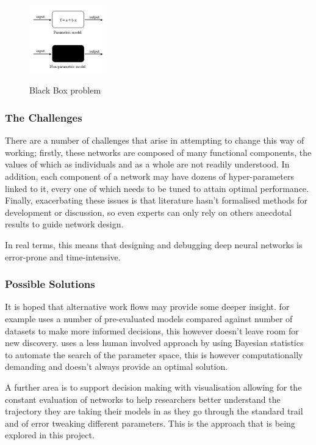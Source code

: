 \documentclass[a4paper,11pt,titlepage]{article}
\begin{document}
		\begin{figure}[H]
    			\centering	
			{{\includegraphics[width=0.3\textwidth]
    				{img/black_box.png} 
    			}}%
    			\caption{Black Box problem}%
    			\label{fig:BlackBox}
		\end{figure}	
		
		\subsubsection{The Challenges}
		
		There are a number of challenges that arise in attempting to change this way of working; firstly, these networks are composed of many functional components, the values of which as individuals and as a whole are not readily understood. In addition, each component of a network may have dozens of hyper-parameters linked to it, every one of which needs to be tuned to attain optimal performance. Finally, exacerbating these issues is that literature hasn't formalised methods for development or discussion, so even experts can only rely on others anecdotal results to guide network design.
		\par 
		In real terms, this means that designing and debugging deep neural networks is error-prone and time-intensive. 
		\par 
		\subsubsection{Possible Solutions}
		It is hoped that alternative work flows may provide some deeper insight. \cite{Jarrett2009} for example uses a number of pre-evaluated models compared against number of datasets to make more informed decisions, this however doesn't leave room for new discovery. \cite{Bergstra2013} uses a less human involved approach by using Bayesian statistics to automate the search of the parameter space, this is however computationally demanding and doesn't always provide an optimal solution. 
		\par 
		A further area is to support decision making with visualisation allowing for the constant evaluation of networks to help researchers better understand the trajectory they are taking their models in as they go through the standard trail and of error tweaking different parameters. This is the approach that is being explored in this project. 
		\par
\end{document}
